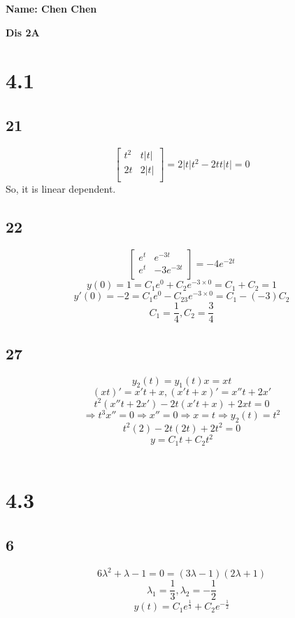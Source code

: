 \documentclass[12pt, a4paper]{IEEEtran}
\begin{document}
    \centerline{\textbf{Name: Chen Chen}}
    
    \centerline{\textbf{Dis 2A}}

    \section*{4.1}
    \subsection*{21}
    $$\left[
        \begin{matrix}
            t^2&t|t|\\
            2t&2|t|\\
        \end{matrix}
        \right]
    =2|t|t^2-2tt|t|=0$$
    So, it is linear dependent.

    \subsection*{22}
    
    $$\left[
        \begin{matrix}
            e^t&e^{-3t}\\
            e^t&-3e^{-3t}\\
        \end{matrix}
        \right]
    =-4e^{-2t}$$
    $$y(0)=1=C_1e^0+C_2e^{-3\times 0}=C_1+C_2=1$$
    $$y'(0)=-2=C_1e^0-C_23e^{-3\times 0}=C_1-(-3)C_2$$
    $$C_1=\frac{1}{4}, C_2=\frac{3}{4}$$

    \subsection*{27}
    $$y_2(t)=y_1(t)x=xt$$
    $$(xt)'=x't+x, (x't+x)'=x''t+2x'$$
    $$t^2(x''t+2x')-2t(x't+x)+2xt=0$$
    $$\Rightarrow t^3x''=0 \Rightarrow x''=0\Rightarrow x=t\Rightarrow y_2(t)=t^2$$
    $$t^2(2)-2t(2t)+2t^2=0$$
    $$y=C_1t+C_2t^2$$\\
    

    \section*{4.3}

    \subsection*{6}
    $$6\lambda^2+\lambda-1=0= (3\lambda-1)(2\lambda+1)$$
    $$\lambda_1=\frac{1}{3}, \lambda_2=-\frac{1}{2}$$
    $$y(t)=C_1e^{\frac{1}{3}}+C_2e^{-\frac{1}{2}}$$
\end{document}
